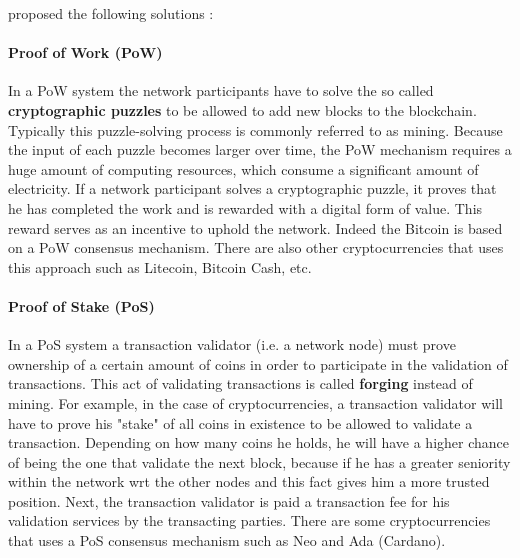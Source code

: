 proposed the following solutions :

\paragraph{Proof of Work (PoW)} In a PoW system the network participants have to solve the so called \textbf{cryptographic puzzles} to be allowed to add new blocks to the blockchain. Typically this puzzle-solving process is commonly referred to as mining. Because the input of each puzzle becomes larger over time, the PoW mechanism requires a huge amount of computing resources, which consume a significant amount of electricity. If a network participant solves a cryptographic puzzle, it proves that he has completed the work and is rewarded with a digital form of value. This reward serves as an incentive to uphold the network. Indeed the Bitcoin is based on a PoW consensus mechanism. There are also other cryptocurrencies that uses this approach such as Litecoin, Bitcoin Cash, etc.

\paragraph{Proof of Stake (PoS)} In a PoS system a transaction validator (i.e. a network node) must prove ownership of a certain amount of coins in order to participate in the validation of transactions. This act of validating transactions is called \textbf{forging} instead of mining. For example, in the case of cryptocurrencies, a transaction validator will have to prove his "stake" of all coins in existence to be allowed to validate a transaction. Depending on how many coins he holds, he will have a higher chance of being the one that validate the next block, because if he has a greater seniority within the network wrt the other nodes and this fact gives him a more trusted position. Next, the transaction validator is paid a transaction fee for his validation services by the transacting parties. There are some cryptocurrencies that uses a PoS consensus mechanism such as Neo and Ada (Cardano).

